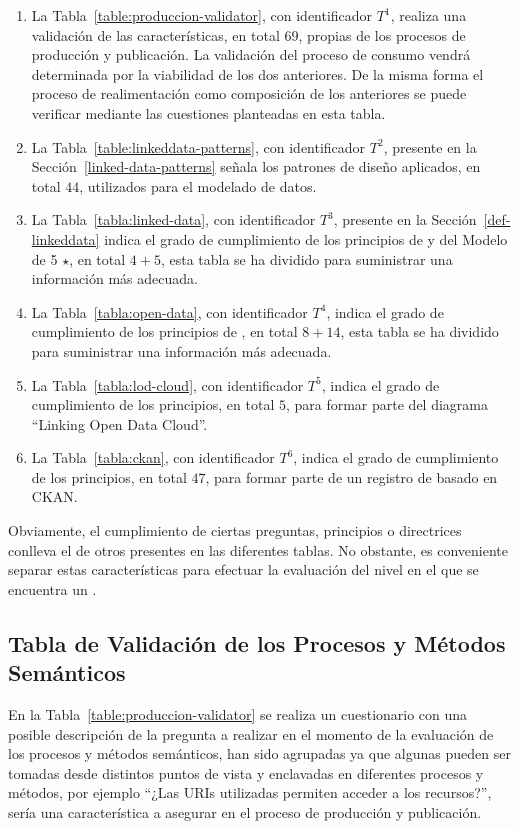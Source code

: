 \begin{enumerate}
 \item La Tabla~\ref{table:produccion-validator}, con identificador $T^{1}$, realiza una validación de las características, en total $69$, 
propias de los procesos de producción y publicación. La validación del proceso de consumo vendrá
determinada por la viabilidad de los dos anteriores. De la misma forma el proceso de realimentación
como composición de los anteriores se puede verificar mediante las cuestiones planteadas en esta tabla.
\item La Tabla~\ref{table:linkeddata-patterns}, con identificador $T^{2}$, presente en la Sección~\ref{linked-data-patterns} señala los patrones de diseño 
aplicados, en total $44$, utilizados para el modelado de datos.
\item La Tabla~\ref{tabla:linked-data}, con identificador $T^{3}$, presente en la Sección~\ref{def-linkeddata} indica el grado
de cumplimiento de los principios de \linkeddata y del Modelo de 5 $\star$, en total $4+5$, esta tabla se ha dividido para suministrar 
una información más adecuada.
\item La Tabla~\ref{tabla:open-data}, con identificador $T^{4}$, indica el grado
de cumplimiento de los principios de \opendata, en total $8+14$, esta tabla se ha dividido para suministrar una información 
más adecuada.
\item La Tabla~\ref{tabla:lod-cloud}, con identificador $T^{5}$, indica el grado de cumplimiento de los principios, en total $5$, para formar parte
del diagrama ``Linking Open Data Cloud''.
\item La Tabla~\ref{tabla:ckan}, con identificador $T^{6}$, indica el grado de cumplimiento de los principios, en total $47$, para formar parte
de un registro de \datasets basado en \gls{CKAN}.
\end{enumerate}

Obviamente, el cumplimiento de ciertas preguntas, principios o directrices conlleva el de 
otros presentes en las diferentes tablas. No obstante, es conveniente separar estas características
para efectuar la evaluación del nivel en el que se encuentra un \dataset.

 
\subsection{Tabla de Validación de los Procesos y Métodos Semánticos}

En la Tabla~\ref{table:produccion-validator} se realiza un cuestionario con una posible descripción
de la pregunta a realizar en el momento de la evaluación de los procesos y métodos semánticos, han sido agrupadas ya que algunas pueden ser tomadas 
desde distintos puntos de vista y enclavadas en diferentes procesos y métodos, por ejemplo ``¿Las URIs utilizadas permiten acceder a los recursos?'', sería
una característica a asegurar en el proceso de producción y publicación.

